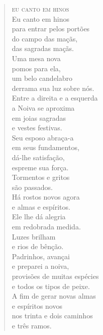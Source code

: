 
\begin{verse}
\textsc{eu canto em hinos}\\[15pt]

Eu canto em hinos\\
para entrar pelos portões\\
do campo das maçãs,\\
das sagradas maçãs.\\[5pt]

Uma mesa nova\\
pomos para ela,\\
um belo candelabro\\
derrama sua luz sobre nós.\\[5pt]

Entre a direita e a esquerda\\
a Noiva se aproxima\\
em joias sagradas\\
e vestes festivas.\\[5pt]

Seu esposo abraça-a\\
em seus fundamentos,\\
dá-lhe satisfação,\\
espreme sua força.\\[5pt]

Tormentos e gritos\\
são passados.\\
Há rostos novos agora\\
e almas e espíritos.\\[5pt]

Ele lhe dá alegria\\
em redobrada medida.\\
Luzes brilham\\
e rios de bênção.\\[5pt]

Padrinhos, avançai\\
e preparei a noiva,\\
provisões de muitas espécies\\
e todos os tipos de peixe.\\[5pt]

A fim de gerar novas almas\\
e espíritos novos\\
nos trinta e dois caminhos\\
e três ramos.\\[5pt]


\end{verse}
